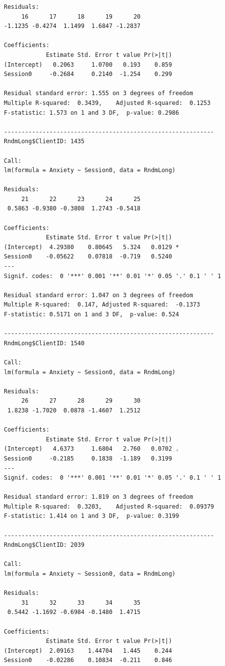 \documentclass[
  11pt,
]{book}
\begin{document}
\begin{verbatim}
Residuals:
     16      17      18      19      20 
-1.1235 -0.4274  1.1499  1.6847 -1.2837 

Coefficients:
            Estimate Std. Error t value Pr(>|t|)
(Intercept)   0.2063     1.0700   0.193    0.859
Session0     -0.2684     0.2140  -1.254    0.299

Residual standard error: 1.555 on 3 degrees of freedom
Multiple R-squared:  0.3439,    Adjusted R-squared:  0.1253 
F-statistic: 1.573 on 1 and 3 DF,  p-value: 0.2986

------------------------------------------------------------ 
RndmLong$ClientID: 1435

Call:
lm(formula = Anxiety ~ Session0, data = RndmLong)

Residuals:
     21      22      23      24      25 
 0.5863 -0.9380 -0.3808  1.2743 -0.5418 

Coefficients:
            Estimate Std. Error t value Pr(>|t|)  
(Intercept)  4.29380    0.80645   5.324   0.0129 *
Session0    -0.05622    0.07818  -0.719   0.5240  
---
Signif. codes:  0 '***' 0.001 '**' 0.01 '*' 0.05 '.' 0.1 ' ' 1

Residual standard error: 1.047 on 3 degrees of freedom
Multiple R-squared:  0.147, Adjusted R-squared:  -0.1373 
F-statistic: 0.5171 on 1 and 3 DF,  p-value: 0.524

------------------------------------------------------------ 
RndmLong$ClientID: 1540

Call:
lm(formula = Anxiety ~ Session0, data = RndmLong)

Residuals:
     26      27      28      29      30 
 1.8238 -1.7020  0.0878 -1.4607  1.2512 

Coefficients:
            Estimate Std. Error t value Pr(>|t|)  
(Intercept)   4.6373     1.6804   2.760   0.0702 .
Session0     -0.2185     0.1838  -1.189   0.3199  
---
Signif. codes:  0 '***' 0.001 '**' 0.01 '*' 0.05 '.' 0.1 ' ' 1

Residual standard error: 1.819 on 3 degrees of freedom
Multiple R-squared:  0.3203,    Adjusted R-squared:  0.09379 
F-statistic: 1.414 on 1 and 3 DF,  p-value: 0.3199

------------------------------------------------------------ 
RndmLong$ClientID: 2039

Call:
lm(formula = Anxiety ~ Session0, data = RndmLong)

Residuals:
     31      32      33      34      35 
 0.5442 -1.1692 -0.6984 -0.1480  1.4715 

Coefficients:
            Estimate Std. Error t value Pr(>|t|)
(Intercept)  2.09163    1.44704   1.445    0.244
Session0    -0.02286    0.10834  -0.211    0.846


\end{verbatim}
\end{document}
